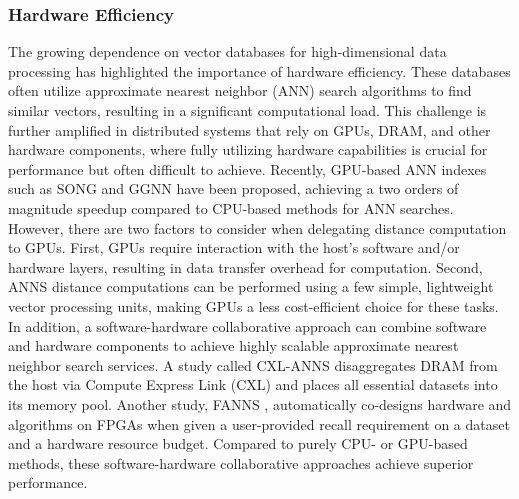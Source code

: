 \subsubsection{Hardware Efficiency}
The growing dependence on vector databases for high-dimensional data processing has highlighted the importance of hardware efficiency. These databases often utilize approximate nearest neighbor (ANN) search algorithms to find similar vectors, resulting in a significant computational load. This challenge is further amplified in distributed systems that rely on GPUs, DRAM, and other hardware components, where fully utilizing hardware capabilities is crucial for performance but often difficult to achieve.
Recently, GPU-based ANN indexes such as SONG \cite{DBLP:conf/icde/ZhaoTL20} and GGNN \cite{DBLP:journals/tbd/GrohRWL23} have been proposed, achieving a two orders of magnitude speedup compared to CPU-based methods for ANN searches. However, there are two factors to consider when delegating distance computation to GPUs. First, GPUs require interaction with the host's software and/or hardware layers, resulting in data transfer overhead for computation. Second, ANNS distance computations can be performed using a few simple, lightweight vector processing units, making GPUs a less cost-efficient choice for these tasks.
In addition, a software-hardware collaborative approach can combine software and hardware components to achieve highly scalable approximate nearest neighbor search services. A study called CXL-ANNS \cite{DBLP:conf/usenix/JangCBLKJ23} disaggregates DRAM from the host via Compute Express Link (CXL) and places all essential datasets into its memory pool. Another study, FANNS \cite{DBLP:journals/corr/abs-2306-11182}, automatically co-designs hardware and algorithms on FPGAs when given a user-provided recall requirement on a dataset and a hardware resource budget. Compared to purely CPU- or GPU-based methods, these software-hardware collaborative approaches achieve superior performance.


